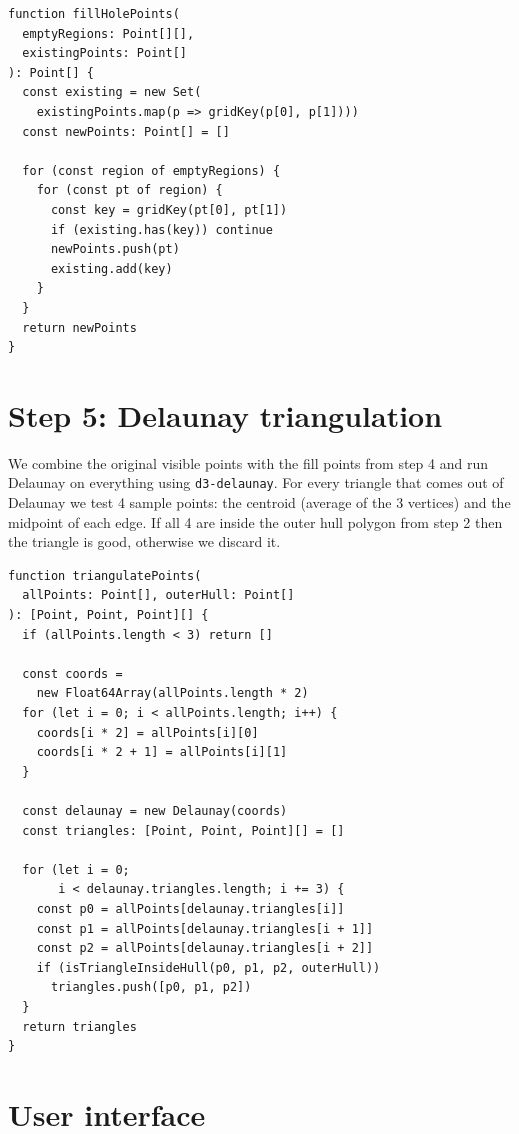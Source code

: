 \documentclass[12pt]{extreport}
\begin{document}
\begin{lstlisting}[style=tsstyle, caption={Filling holes (\texttt{grid.ts})}]
function fillHolePoints(
  emptyRegions: Point[][],
  existingPoints: Point[]
): Point[] {
  const existing = new Set(
    existingPoints.map(p => gridKey(p[0], p[1])))
  const newPoints: Point[] = []

  for (const region of emptyRegions) {
    for (const pt of region) {
      const key = gridKey(pt[0], pt[1])
      if (existing.has(key)) continue
      newPoints.push(pt)
      existing.add(key)
    }
  }
  return newPoints
}
\end{lstlisting}

\section{Step 5: Delaunay triangulation}

We combine the original visible points with the fill points from step 4 and run Delaunay on everything using \texttt{d3-delaunay}. For every triangle that comes out of Delaunay we test 4 sample points: the centroid (average of the 3 vertices) and the midpoint of each edge. If all 4 are inside the outer hull polygon from step 2 then the triangle is good, otherwise we discard it.

\begin{lstlisting}[style=tsstyle, caption={Triangulation with hull filtering (\texttt{grid.ts})}]
function triangulatePoints(
  allPoints: Point[], outerHull: Point[]
): [Point, Point, Point][] {
  if (allPoints.length < 3) return []

  const coords =
    new Float64Array(allPoints.length * 2)
  for (let i = 0; i < allPoints.length; i++) {
    coords[i * 2] = allPoints[i][0]
    coords[i * 2 + 1] = allPoints[i][1]
  }

  const delaunay = new Delaunay(coords)
  const triangles: [Point, Point, Point][] = []

  for (let i = 0;
       i < delaunay.triangles.length; i += 3) {
    const p0 = allPoints[delaunay.triangles[i]]
    const p1 = allPoints[delaunay.triangles[i + 1]]
    const p2 = allPoints[delaunay.triangles[i + 2]]
    if (isTriangleInsideHull(p0, p1, p2, outerHull))
      triangles.push([p0, p1, p2])
  }
  return triangles
}
\end{lstlisting}

\section{User interface}
\end{document}
